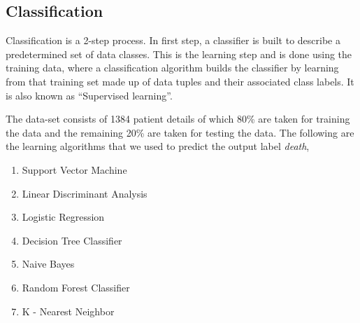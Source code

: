 \documentclass[conference]{IEEEtran}
\begin{document}
\subsection{Classification}
\label{ssec:classification}
Classification is a 2-step process. In first step, a classifier is built to describe a predetermined set of data classes. This is the learning step and is done using the training data, where a classification algorithm builds the classifier by learning from that training set made up of data tuples and their associated class labels. It is also known as “Supervised learning”.
\par
The data-set consists of 1384 patient details of which 80\% are taken for training the data and the remaining 20\% are taken for testing the data. The following are the learning algorithms that we used to predict the output label \textit{death},
\begin{enumerate}
\item Support Vector Machine
\item Linear Discriminant Analysis
\item Logistic Regression
\item Decision Tree Classifier
\item Naive Bayes
\item Random Forest Classifier
\item K - Nearest Neighbor
\end{enumerate}
\par
\end{document}
